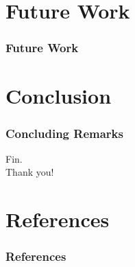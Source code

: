 \documentclass[xcolor={dvipsnames}]{beamer}
\begin{document}
\section{Future Work}

\begin{frame}
  \frametitle{Future Work}
\end{frame}

\section{Conclusion}

\begin{frame}
  \frametitle{Concluding Remarks}
\end{frame}



\begin{frame}
    \center
    \huge{Fin.}\\
    \normalsize{Thank you!}
\end{frame}


\section{References}

\begin{frame}[allowframebreaks]
    \frametitle{References}

    \printbibliography[heading=bibintoc]
\end{frame}
\end{document}
